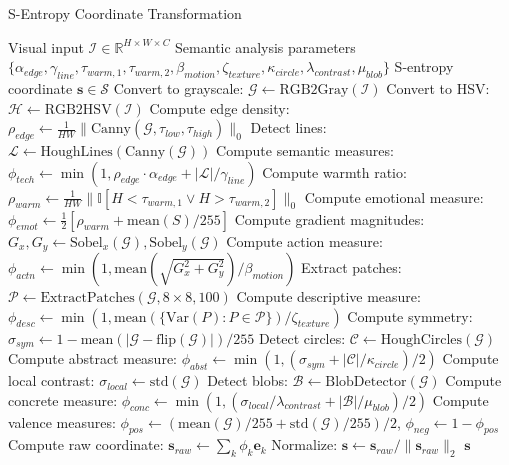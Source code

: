 \begin{algorithm}
\caption{S-Entropy Coordinate Transformation}
\label{alg:s-entropy-transform}
\begin{algorithmic}[1]
\REQUIRE Visual input $\mathcal{I} \in \mathbb{R}^{H \times W \times C}$
\REQUIRE Semantic analysis parameters $\{\alpha_{edge}, \gamma_{line}, \tau_{warm,1}, \tau_{warm,2}, \beta_{motion}, \zeta_{texture}, \kappa_{circle}, \lambda_{contrast}, \mu_{blob}\}$
\ENSURE S-entropy coordinate $\mathbf{s} \in \mathcal{S}$
\STATE Convert to grayscale: $\mathcal{G} \leftarrow \text{RGB2Gray}(\mathcal{I})$
\STATE Convert to HSV: $\mathcal{H} \leftarrow \text{RGB2HSV}(\mathcal{I})$
\STATE Compute edge density: $\rho_{edge} \leftarrow \frac{1}{HW}\|\text{Canny}(\mathcal{G}, \tau_{low}, \tau_{high})\|_0$
\STATE Detect lines: $\mathcal{L} \leftarrow \text{HoughLines}(\text{Canny}(\mathcal{G}))$
\STATE Compute semantic measures: $\phi_{tech} \leftarrow \min(1, \rho_{edge} \cdot \alpha_{edge} + |\mathcal{L}|/\gamma_{line})$
\STATE Compute warmth ratio: $\rho_{warm} \leftarrow \frac{1}{HW}\|\mathbb{I}[H < \tau_{warm,1} \vee H > \tau_{warm,2}]\|_0$
\STATE Compute emotional measure: $\phi_{emot} \leftarrow \frac{1}{2}[\rho_{warm} + \text{mean}(S)/255]$
\STATE Compute gradient magnitudes: $G_x, G_y \leftarrow \text{Sobel}_x(\mathcal{G}), \text{Sobel}_y(\mathcal{G})$
\STATE Compute action measure: $\phi_{actn} \leftarrow \min(1, \text{mean}(\sqrt{G_x^2 + G_y^2})/\beta_{motion})$
\STATE Extract patches: $\mathcal{P} \leftarrow \text{ExtractPatches}(\mathcal{G}, 8 \times 8, 100)$
\STATE Compute descriptive measure: $\phi_{desc} \leftarrow \min(1, \text{mean}(\{\text{Var}(P) : P \in \mathcal{P}\})/\zeta_{texture})$
\STATE Compute symmetry: $\sigma_{sym} \leftarrow 1 - \text{mean}(|\mathcal{G} - \text{flip}(\mathcal{G})|)/255$
\STATE Detect circles: $\mathcal{C} \leftarrow \text{HoughCircles}(\mathcal{G})$
\STATE Compute abstract measure: $\phi_{abst} \leftarrow \min(1, (\sigma_{sym} + |\mathcal{C}|/\kappa_{circle})/2)$
\STATE Compute local contrast: $\sigma_{local} \leftarrow \text{std}(\mathcal{G})$
\STATE Detect blobs: $\mathcal{B} \leftarrow \text{BlobDetector}(\mathcal{G})$
\STATE Compute concrete measure: $\phi_{conc} \leftarrow \min(1, (\sigma_{local}/\lambda_{contrast} + |\mathcal{B}|/\mu_{blob})/2)$
\STATE Compute valence measures: $\phi_{pos} \leftarrow (\text{mean}(\mathcal{G})/255 + \text{std}(\mathcal{G})/255)/2$, $\phi_{neg} \leftarrow 1 - \phi_{pos}$
\STATE Compute raw coordinate: $\mathbf{s}_{raw} \leftarrow \sum_k \phi_k \mathbf{e}_k$
\STATE Normalize: $\mathbf{s} \leftarrow \mathbf{s}_{raw} / \|\mathbf{s}_{raw}\|_2$
\RETURN $\mathbf{s}$
\end{algorithmic}
\end{algorithm}

